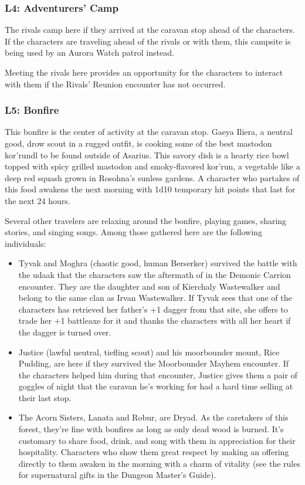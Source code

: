 \documentclass[10pt,a4paper,twoside,twocolumn,openany,nodeprecatedcode]{dndbook}
\begin{document}
\subsubsection{L4: Adventurers' Camp}
The rivals camp here if they arrived at the caravan stop ahead of the characters. If the characters are traveling ahead of the rivals or with them, this campsite is being used by an Aurora Watch patrol instead.

Meeting the rivals here provides an opportunity for the characters to interact with them if the Rivals' Reunion encounter has not occurred.

\subsubsection{L5: Bonfire}
This bonfire is the center of activity at the caravan stop. Gaeya Iliera, a neutral good, drow scout in a rugged outfit, is cooking some of the best mastodon kor'rundl to be found outside of Asarius. This savory dish is a hearty rice bowl topped with spicy grilled mastodon and smoky-flavored kor'run, a vegetable like a deep red squash grown in Rosohna's sunless gardens. A character who partakes of this food awakens the next morning with 1d10 temporary hit points that last for the next 24 hours.

Several other travelers are relaxing around the bonfire, playing games, sharing stories, and singing songs. Among those gathered here are the following individuals:


\begin{itemize}
\item Tyvak and Moghra (chaotic good, human Berserker) survived the battle with the udaak that the characters saw the aftermath of in the Demonic Carrion encounter. They are the daughter and son of Kierchaly Wastewalker and belong to the same clan as Irvan Wastewalker. If Tyvak sees that one of the characters has retrieved her father's +1 dagger from that site, she offers to trade her +1 battleaxe for it and thanks the characters with all her heart if the dagger is turned over.
\item Justice (lawful neutral, tiefling scout) and his moorbounder mount, Rice Pudding, are here if they survived the Moorbounder Mayhem encounter. If the characters helped him during that encounter, Justice gives them a pair of goggles of night that the caravan he's working for had a hard time selling at their last stop.
\item The Acorn Sisters, Lanata and Robur, are Dryad. As the caretakers of this forest, they're fine with bonfires as long as only dead wood is burned. It's customary to share food, drink, and song with them in appreciation for their hospitality. Characters who show them great respect by making an offering directly to them awaken in the morning with a charm of vitality (see the rules for supernatural gifts in the Dungeon Master's Guide).
\end{itemize}
\end{document}
